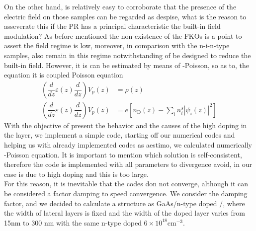 On the other hand, is relatively easy to corroborate that the presence of the electric field on those samples can be regarded as despise, what is the reason to asseverate this if the PR has a principal characteristic the built-in field modulation?
As before mentioned the non-existence of the FKOs is a point to assert the field regime is low, moreover, in comparison with the n-i-n-type samples, also remain in this regime notwithstanding of be designed to reduce the built-in field. However, it is can be estimated by means of \sch-Poisson, so as to, the equation  it is coupled Poisson equation\cite{jirauschek2014modeling,harrison2016chap3}
\begin{align}
	\left(\dfrac{d}{dz}\varepsilon(z)\dfrac{d}{dz}\right) V_{p}(z)&=\rho (z)
	\label{eq:chapter-3-poisson-equation-1}\\
	\left(\dfrac{d}{dz}\varepsilon(z)\dfrac{d}{dz}\right) V_{p}(z)&=e\left[n_{\mathrm{D}}(z)-\sum_{i}n_{i}^{s}\left|\psi_{i}(z)\right|^2\right]
	\label{eq:chapter-3-poisson-equation-2}
\end{align}
With the objective of present the behavior and the causes of the high doping in the \algaas layer, we implement a simple code, starting off our numerical codes and helping us with already implemented codes as \gls{aestimo}\cite{hebal2021general},  we calculated numerically \sch-Poisson equation. It is important to mention which solution is self-consistent, therefore the code is implemented with all parameters to divergence avoid,  in our case is due to high doping and this is too large.\\
For this reason, it is inevitable that the codes don not converge, although it can be considered a factor damping to speed convergence\cite{ram2004theschrodinger}.
We consider the damping factor, and we decided to calculate a structure as GaAs/n-type doped \algaas/\algaas, where the width of lateral layers is fixed and the width of the doped layer varies from 15nm to 300 nm with the same n-type doped $6\times 10^{18} \mathrm{cm^{-3}}$.
